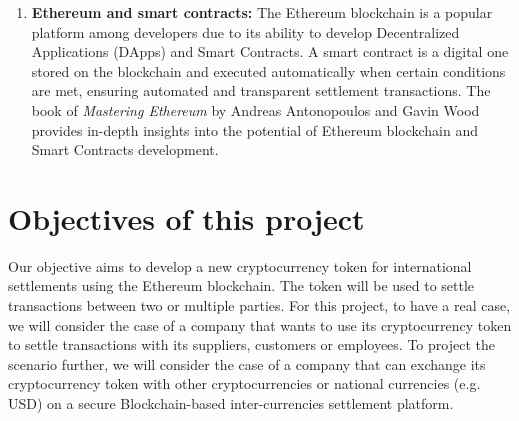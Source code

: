 \begin{enumerate}
    \item \textbf{Ethereum and smart contracts:}
          The Ethereum blockchain is a popular platform among developers due to its ability to develop Decentralized Applications (DApps) and Smart Contracts.
          A smart contract is a digital one stored on the blockchain and executed automatically when certain conditions are met, ensuring automated
          and transparent settlement transactions. The book of \textit{Mastering Ethereum} by Andreas Antonopoulos and Gavin Wood \cite{Antonopoulos2018-wp} provides
          in-depth insights into the potential of Ethereum blockchain and Smart Contracts development.
\end{enumerate}

\section{Objectives of this project}

Our objective aims to develop a new cryptocurrency token for international settlements using the Ethereum blockchain. The token will be used to settle transactions
between two or multiple parties. For this project, to have a real case, we will consider the case of a company that wants to use its cryptocurrency token to settle transactions with its suppliers, customers or employees.
To project the scenario further, we will consider the case of a company that can exchange its cryptocurrency token with other cryptocurrencies or national currencies (e.g. USD) on a secure Blockchain-based inter-currencies settlement
platform.







